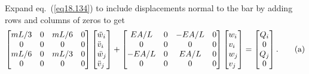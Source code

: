 \documentclass{AeroStructure-ERJohnson}
\begin{document}
Expand eq.~(\ref{eq18.134}) to include displacements normal to the bar by adding rows and columns of zeros to get\vspace*{0.5pc}
\begin{align}\label{eq18.7a}
\left[\begin{array}{@{}cccc@{}}m L/3 & 0 & m L/6 & 0 \\0 & 0 & 0 & 0 \\m L/6 & 0 & m L/3 & 0 \\0 & 0 & 0 & 0\end{array}\right]\left[\begin{array}{@{}l@{}}\ddot{w}_{i} \\\ddot{v}_{i} \\\ddot{w}_{j} \\\ddot{v}_{j}\end{array}\right]+\left[\begin{array}{@{}cccc@{}}E A/L & 0 & -E A/L & 0 \\0 & 0 & 0 & 0 \\-E A/L & 0 & E A/L & 0 \\0 & 0 & 0 & 0\end{array}\right]\left[\begin{array}{@{}l@{}}w_{i} \\v_{i} \\w_{j} \\v_{j}\end{array}\right]=\left[\begin{array}{@{}c@{}}Q_{i} \\0 \\Q_{j} \\0\end{array}\right].\tag{a}
\end{align}

\pagebreak
\end{document}
